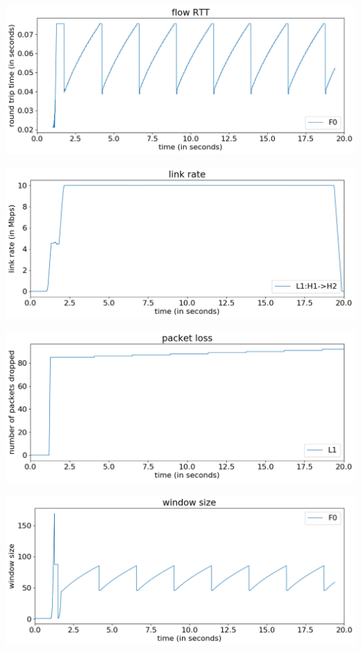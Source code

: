 \documentclass{article}
\begin{document}
\includegraphics[width = \textwidth]{"test_case0_reno flow RTT"}

\includegraphics[width = \textwidth]{"test_case0_reno link rate"}

\includegraphics[width = \textwidth]{"test_case0_reno packet loss"}

\includegraphics[width = \textwidth]{"test_case0_reno window size"}
\end{document}
